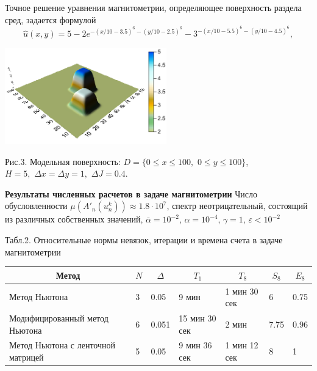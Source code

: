 \documentclass[10pt,pdf, mathserif, hyperref={unicode}]{beamer}
\begin{document}
\begin{frame}
	Точное решение уравнения магнитометрии, определяющее поверхность раздела сред, задается формулой %
	\begin{equation*}
	\hat{u}(x,y)=5-2e^{-(x/10-3.5)^6-(y/10-2.5)^6}-3^{-(x/10-5.5)^6-(y/10-4.5)^6},
	\end{equation*}
	\begin{center}
		\includegraphics[width=7cm, height=4 cm]{Magne_exact.png}            %
	\end{center}
	
	\begin{center}
		Рис.3. Модельная поверхность: $D=\{0\le x\le 100, \,\,0\le y\le 100\}$, \\ $  H=5,\,\,\Delta x=\Delta y=1,\,\,\Delta J=0.4$.
	\end{center}
\end{frame}
\begin{frame}{\small\textbf{Результаты численных расчетов в задаче магнитометрии}}
	Число обусловленности $\mu(A'_n(u_n^k))\approx 1.8\cdot 10^7$, спектр неотрицательный, состоящий из различных собственных значений, $\bar\alpha=10^{-2}$, $\alpha = 10^{-4}$, $\gamma=1$, $\varepsilon < 10^{-2}$
	
	\begin{table}
		\centering
		{\scriptsize Табл.2. Относительные нормы невязок, итерации и времена счета в задаче магнитометрии}
		
		\smallskip
		\begin{tabular}{|p{}|p{}|l|l|l|l|l|}
			\hline
			\multicolumn{1}{|c|}{Метод}        & \multicolumn{1}{c|}{$N$} &
			\multicolumn{1}{c|}{$\Delta$} &
			\multicolumn{1}{c|}{$T_1$} & \multicolumn{1}{c|}{$T_8$} &	\multicolumn{1}{c|}{$S_8$}&\multicolumn{1}{c|}{$E_8$} \\ \hline
			Метод Ньютона                      &   3             & 0.05                  &     9 мин                   &      1 мин 30 сек   
			& 6 &        0.75     \\ \hline
			Модифицированный метод Ньютона     &              6           & 0.051           & 15 мин 30 сек                & 2 мин  & 7.75 & 0.96\\ \hline
			Метод Ньютона с ленточной матрицей &   5                    & 0.05               & 9 мин 36 сек    & 1 мин 12 сек & 8 & 1   \\ \hline
		\end{tabular}
	\end{table}
\end{frame}
\end{document}
